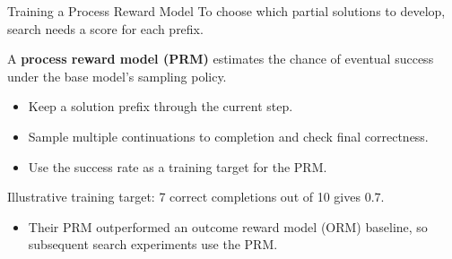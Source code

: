 \documentclass[aspectratio=1610,xcolor=dvipsnames,t]{beamer}
\newcommand{\keyterm}[1]{\textcolor{unirot}{\textbf{#1}}}
\begin{document}
\begin{frame}{Training a Process Reward Model}
  To choose which partial solutions to develop, search needs a score for each prefix.
  \par\smallskip
  A \keyterm{process reward model (PRM)} estimates the chance of eventual success under the base model's sampling policy.
  \par\medskip
  \begin{itemize}
    \item Keep a solution prefix through the current step.
    \item Sample multiple continuations to completion and check final correctness.
    \item Use the success rate as a training target for the PRM.
  \end{itemize}
  \par\medskip
  Illustrative training target: 7 correct completions out of 10 gives $0.7$.
  \par\smallskip
  \begin{itemize}
    \item Their PRM outperformed an outcome reward model (ORM) baseline, so subsequent search experiments use the PRM.
  \end{itemize}
\end{frame}
\end{document}

